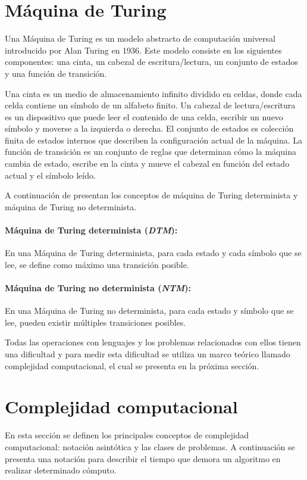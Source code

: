 \documentclass[12pt]{article}
\begin{document}
\section{Máquina de Turing}

Una Máquina de Turing \cite{authomataTheory} es un modelo abstracto de computación universal introducido por 
Alan Turing en 1936. Este modelo consiste en los siguientes componentes: una cinta, un cabezal de escritura/lectura,
un conjunto de estados y una función de transición.

Una cinta es un medio de almacenamiento infinito dividido en celdas, donde cada celda contiene un símbolo de un alfabeto finito.
Un cabezal de lectura/escritura es un dispositivo que puede leer el contenido de una celda, escribir un nuevo símbolo y moverse a la izquierda o derecha.
El conjunto de estados es colección finita de estados internos que describen la configuración actual de la máquina.
La función de transición es un conjunto de reglas que determinan cómo la máquina cambia de estado, escribe en la cinta y mueve el cabezal en función del estado actual y el símbolo leído.

A continuación de presentan los conceptos de máquina de Turing determinista y máquina de Turing no determinista.

\paragraph{Máquina de Turing determinista (\textit{DTM}):}
En una Máquina de Turing determinista, para cada estado y cada símbolo que se lee, se define como
máximo una transición posible.
\paragraph{Máquina de Turing no determinista (\textit{NTM}):}
En una Máquina de Turing no determinista, para cada estado y símbolo que se lee, pueden existir múltiples transiciones posibles.

Todas las operaciones con lenguajes y los problemas relacionados con ellos tienen una dificultad y para medir esta dificultad
se utiliza un marco teórico llamado complejidad computacional, el cual se presenta en la próxima sección.

\section{Complejidad computacional}

En esta sección se definen los principales conceptos de complejidad computacional: notación asintótica
y las clases de problemas. A continuación se presenta una notación para describir el tiempo que demora un 
algoritmo en realizar determinado cómputo.
\end{document}
